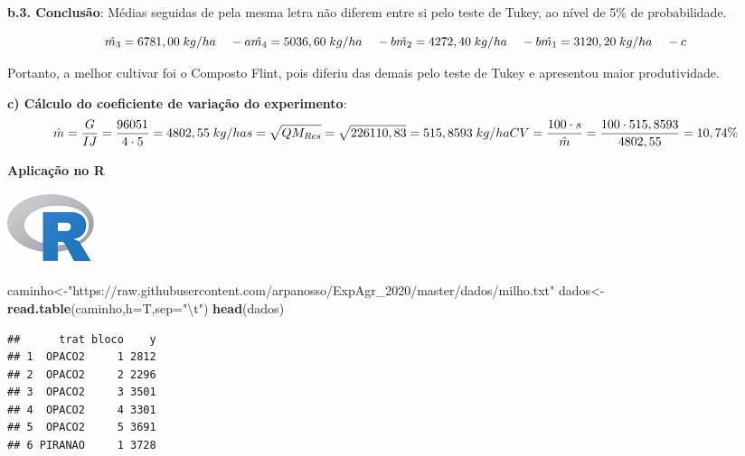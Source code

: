 \documentclass[
]{book}
\newenvironment{Shaded}{\begin{snugshade}}{\end{snugshade}}
\newcommand{\CharTok}[1]{\textcolor[rgb]{0.31,0.60,0.02}{#1}}
\newcommand{\CommentTok}[1]{\textcolor[rgb]{0.56,0.35,0.01}{\textit{#1}}}
\newcommand{\DataTypeTok}[1]{\textcolor[rgb]{0.13,0.29,0.53}{#1}}
\newcommand{\KeywordTok}[1]{\textcolor[rgb]{0.13,0.29,0.53}{\textbf{#1}}}
\newcommand{\NormalTok}[1]{#1}
\newcommand{\OperatorTok}[1]{\textcolor[rgb]{0.81,0.36,0.00}{\textbf{#1}}}
\newcommand{\StringTok}[1]{\textcolor[rgb]{0.31,0.60,0.02}{#1}}
\begin{document}
\textbf{b.3. Conclusão}: Médias seguidas de pela mesma letra não diferem entre si pelo teste de Tukey, ao nível de 5\% de probabilidade.

\[
\hat{m_3} = 6781,00\;kg/ha\;\;\;\;-a\\
\hat{m_4} = 5036,60\;kg/ha\;\;\;\;-b\\
\hat{m_2} = 4272,40\;kg/ha\;\;\;\;-b\\
\hat{m_1} = 3120,20\;kg/ha\;\;\;\;-c\\
\]

Portanto, a melhor cultivar foi o Composto Flint, pois diferiu das demais pelo teste de Tukey e apresentou maior produtividade.

\textbf{c) Cálculo do coeficiente de variação do experimento}:
\[
\hat{m}=\frac{G}{IJ}=\frac{96051}{4\cdot5}=4802,55\;kg/ha\\
s=\sqrt{QM_{Res}}=\sqrt{226110,83}=515,8593\;kg/ha\\
CV=\frac{100\cdot s}{\hat{m}}=\frac{100\cdot515,8593}{4802,55}=10,74\%
\]

\textbf{Aplicação no R}

\includegraphics{R.png}

\begin{Shaded}
\begin{Highlighting}[]
\NormalTok{caminho<-}\StringTok{"https://raw.githubusercontent.com/arpanosso/ExpAgr_2020/master/dados/milho.txt"}
\NormalTok{dados<-}\KeywordTok{read.table}\NormalTok{(caminho,}\DataTypeTok{h=}\NormalTok{T,}\DataTypeTok{sep=}\StringTok{"}\CharTok{\textbackslash{}t}\StringTok{"}\NormalTok{)}
\KeywordTok{head}\NormalTok{(dados)}
\end{Highlighting}
\end{Shaded}

\begin{verbatim}
##      trat bloco    y
## 1  OPACO2     1 2812
## 2  OPACO2     2 2296
## 3  OPACO2     3 3501
## 4  OPACO2     4 3301
## 5  OPACO2     5 3691
## 6 PIRANAO     1 3728
\end{verbatim}

\begin{Shaded}
\end{Shaded}
\end{document}
